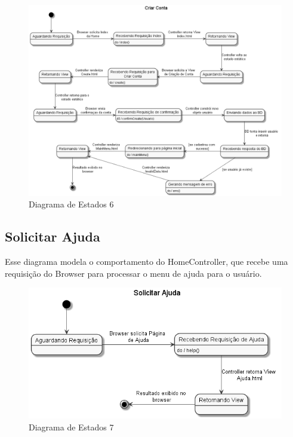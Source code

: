 \documentclass[rascunho,xindy,acronym,symbols]{fei}
\begin{document}
\begin{figure}[H]
    \centering
    \includegraphics[width=\textwidth]{./Images/DE_-_Criar_Conta.png}
    \caption{Diagrama de Estados 6}
    \label{fig:diag_est6}
\end{figure}

\subsection{Solicitar Ajuda}

Esse diagrama modela o comportamento do HomeController, que recebe uma requisição do Browser para processar o menu de ajuda para o usuário.

\begin{figure}[H]
    \centering
    \includegraphics[width=\textwidth]{./Images/DE_-_Solicitar_Ajuda.png}
    \caption{Diagrama de Estados 7}
    \label{fig:diag_est7}
\end{figure}
\end{document}
